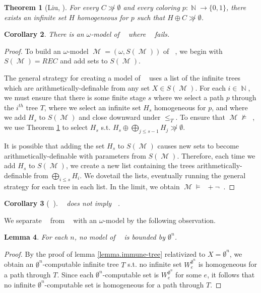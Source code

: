 \documentclass{amsart}
\theoremstyle{plain}
\newtheorem{theorem}{Theorem}
\newtheorem{lemma}[theorem]{Lemma}
\newtheorem{corollary}[theorem]{Corollary}
\theoremstyle{remark}
\theoremstyle{definition}
\DeclareMathOperator{\RCA}{\mathsf{RCA}_0}
\DeclareMathOperator{\WKL}{\mathsf{WKL}_0}
\DeclareMathOperator{\RKLp}{\mathsf{RKL}^{(1)}}
\DeclareMathOperator{\RKLa}{\mathsf{RKL}^{(<\omega)}}
\DeclareMathOperator{\N}{\mathbb{N}}
\DeclareMathOperator{\M}{\mathcal{M}}
\begin{document}
\begin{theorem}[Liu, \cite{liu}]
\label{thm.liu}
For every $C\not \gg\emptyset$ and every coloring $p:\N\rightarrow\{0,1\}$, there exists an infinite set $H$ homogeneous for $p$ such that $H\oplus C\not \gg\emptyset$.
\end{theorem}

\begin{corollary}
There is an $\omega$-model of $\RKLa$ where $\WKL$ fails.
\end{corollary}
\begin{proof}
To build an $\omega$-model $\M=(\omega,S(\M))$ of $\RKLa$, we begin with $S(\M)=REC$ and add sets to $S(\M)$.  
\par
The general strategy for creating a model of $\RKLa$ uses a list of the infinite trees which are arithmetically-definable from any set $X\in S(\M)$.  
For each $i\in \N$, we must ensure that there is some finite stage $s$ where we select a path $p$ through the $i^{th}$ tree $T$, where we select an infinite set $H_s$ homogeneous for $p$, and where we add $H_s$ to $S(\M)$ and close downward under $\leq_T$.  To ensure that $\M\not\models\WKL$, we use Theorem \ref{thm.liu} to select $H_s$ s.t. $H_s\oplus\bigoplus_{j\leq s-1} H_j\not\gg\emptyset$.
\par   
It is possible that adding the set $H_s$ to $S(\M)$ causes new sets to become arithmetically-definable with parameters from $S(\M)$.  
Therefore, each time we add $H_s$ to $S(\M)$, we create a new list containing the trees arithmetically-definable from $\bigoplus_{i\leq s} H_i$.  
We dovetail the lists, eventually running the general strategy for each tree in each list.  
In the limit, we obtain $\M\models\RKLa+\neg\WKL$.
\end{proof}

\begin{corollary}[$\RCA$]
$\RKLa$ does not imply $\WKL$.
\end{corollary}

We separate $\RKLa$ from $\RKLp$ with an $\omega$-model by the following observation.

\begin{lemma}
For each $n$, no model of $\RKLa$ is bounded by $\emptyset^n$.
\end{lemma}

\begin{proof}
 
By the proof of lemma \ref{lemma.immune-tree} relativized to $X=\emptyset^n$, we obtain an $\emptyset^{n}$-computable infinite tree $T$  s.t. no infinite set $W^{\emptyset^n}_e$ is homogeneous for a path through $T$.  Since each $\emptyset^n$-computable set is $W^{\emptyset^n}_e$ for some $e$, it follows that no infinite $\emptyset^n$-computable set is homogeneous for a path through $T$.
\end{proof}
\end{document}
